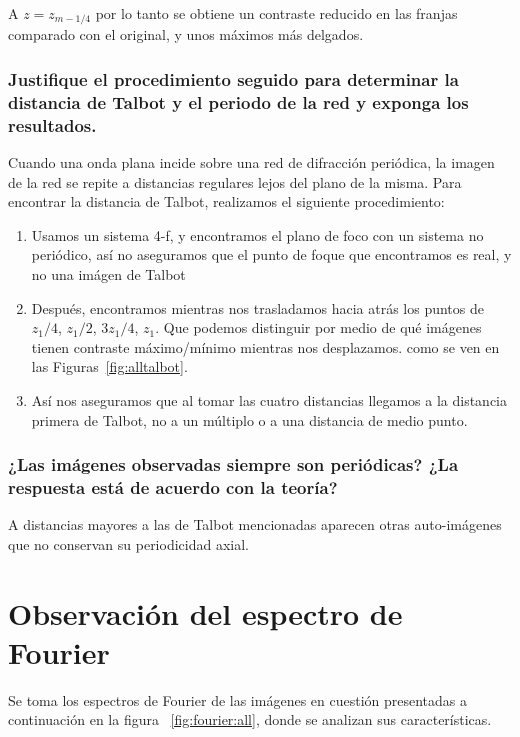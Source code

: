 \documentclass{./packages/optica-article}
\begin{document}
A $z = z_{m - 1/4}$ por lo tanto se obtiene un contraste reducido en las franjas comparado con el original, y unos máximos más delgados.



\subsubsection{Justifique el procedimiento seguido para determinar la distancia de Talbot y el periodo de la red y exponga los resultados.}

Cuando una onda plana incide sobre una red de difracción periódica, la imagen de la red se repite a distancias regulares lejos del plano de la misma. Para encontrar la distancia de Talbot, realizamos el siguiente procedimiento:

\begin{enumerate}
	\item Usamos un sistema 4-f, y encontramos el plano de foco con un sistema no periódico, así no aseguramos que el punto de foque que encontramos es real, y no una imágen de Talbot
	\item Después, encontramos mientras nos trasladamos hacia atrás los puntos de $z_{1}/4$, $z_{1}/2$, $3 z_{1}/4$, $z_{1}$. Que podemos distinguir por medio de qué imágenes tienen contraste máximo/mínimo mientras nos desplazamos. como se ven en las Figuras~\ref{fig:alltalbot}.
	\item Así nos aseguramos que al tomar las cuatro distancias llegamos a la distancia primera de Talbot, no a un múltiplo o a una distancia de medio punto.
\end{enumerate}

\subsubsection{¿Las imágenes observadas siempre son periódicas? ¿La respuesta está de acuerdo con la teoría?}

A distancias mayores a las de Talbot mencionadas aparecen otras auto-imágenes que no conservan su periodicidad axial.


\section{Observación del espectro de Fourier}
Se toma los espectros de Fourier de las imágenes en cuestión presentadas a continuación en la figura ~\ref{fig:fourier:all}, donde se analizan sus características.
\end{document}
